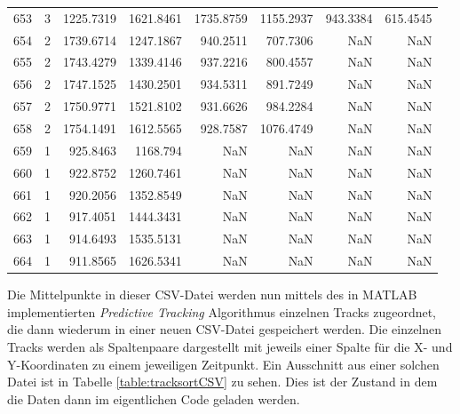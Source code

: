 \begin{table}[]
\begin{tabular}{@{}rcrrrrrr@{}}
    653     & 3    & 1225.7319 & 1621.8461 & 1735.8759 & 1155.2937 & 943.3384 & 615.4545 \\
    654     & 2    & 1739.6714 & 1247.1867 & 940.2511  & 707.7306  & NaN      & NaN      \\
    655     & 2    & 1743.4279 & 1339.4146 & 937.2216  & 800.4557  & NaN      & NaN      \\
    656     & 2    & 1747.1525 & 1430.2501 & 934.5311  & 891.7249  & NaN      & NaN      \\
    657     & 2    & 1750.9771 & 1521.8102 & 931.6626  & 984.2284  & NaN      & NaN      \\
    658     & 2    & 1754.1491 & 1612.5565 & 928.7587  & 1076.4749 & NaN      & NaN      \\
    659     & 1    & 925.8463  & 1168.794  & NaN       & NaN       & NaN      & NaN      \\
    660     & 1    & 922.8752  & 1260.7461 & NaN       & NaN       & NaN      & NaN      \\
    661     & 1    & 920.2056  & 1352.8549 & NaN       & NaN       & NaN      & NaN      \\
    662     & 1    & 917.4051  & 1444.3431 & NaN       & NaN       & NaN      & NaN      \\
    663     & 1    & 914.6493  & 1535.5131 & NaN       & NaN       & NaN      & NaN      \\
    664     & 1    & 911.8565  & 1626.5341 & NaN       & NaN       & NaN      & NaN      \\ \bottomrule
    \end{tabular}
    \normalsize
    
    \label{table:Segmentierungsscript}
    \end{table}
    

Die Mittelpunkte in dieser CSV-Datei werden nun mittels des in MATLAB implementierten \textit{Predictive Tracking} Algorithmus einzelnen Tracks zugeordnet,
die dann wiederum in einer neuen CSV-Datei gespeichert werden.
Die einzelnen Tracks werden als Spaltenpaare dargestellt mit jeweils einer Spalte für die X- und Y-Koordinaten zu einem jeweiligen Zeitpunkt.
Ein Ausschnitt aus einer solchen Datei ist in Tabelle \ref{table:tracksortCSV} zu sehen.
Dies ist der Zustand in dem die Daten dann im eigentlichen Code geladen werden. 


